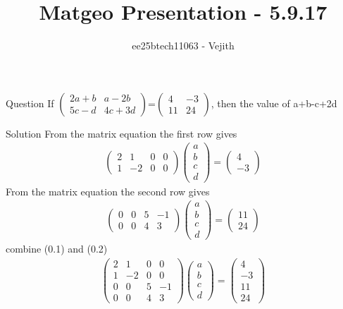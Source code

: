 \documentclass{beamer}
\title{Matgeo Presentation - 5.9.17}
\author{ee25btech11063 - Vejith}
\numberwithin{equation}{section}
\theoremstyle{remark}
\newcommand{\myvec}[1]{\ensuremath{\begin{pmatrix}#1\end{pmatrix}}}
\begin{document}
\frame{\titlepage}
\begin{frame}{Question}
If   $\begin{pmatrix}
    2a+b & a-2b\\
    5c-d & 4c+3d
\end{pmatrix}$=$\begin{pmatrix}
    4 & -3\\
    11 & 24
\end{pmatrix}$, then the value of a+b-c+2d
\end{frame}

 \begin{frame}{Solution}
     From the matrix equation the first row gives
\begin{align}
    \begin{pmatrix}
        2 & 1 & 0 & 0\\
        1 & -2 & 0 & 0
        \end{pmatrix} \myvec{a\\b\\c\\d}=\myvec{4\\-3}
    \end{align}
    From the matrix equation the second row gives
    \begin{align}
    \begin{pmatrix}
        0 & 0 & 5 & -1\\
        0 & 0 & 4 & 3
        \end{pmatrix} \myvec{a\\b\\c\\d}=\myvec{11\\24}
    \end{align}
combine (0.1) and (0.2)
\begin{align}
    \begin{pmatrix}
        2 & 1 & 0 & 0\\
        1 & -2 & 0 & 0\\
        0 & 0 & 5 & -1\\
        0 & 0 & 4 & 3
        \end{pmatrix} \myvec{a\\b\\c\\d}=\myvec{4\\-3\\11\\24}
\end{align}
\end{frame}
\end{document}
